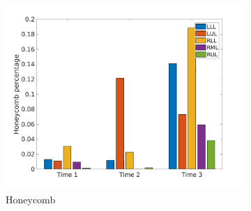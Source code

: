 \begin{figure}[H]
\begin{subfigure}{.46\linewidth}
  \includegraphics[width=\linewidth,trim={{.0\wd0} {.0\wd0} {.0\wd0} {.0\wd0}},clip]{QuantitativeAnalysis/Image/IPF15HoneycombLobarRegionDiseaseDistributionOverTime.jpg} %
  \caption{Honeycomb}
  \label{fig:IPF15LobarRegionDiseaseDistributionOverTimeMain-c} 
\end{subfigure} 
\hspace{.3in}
\begin{subfigure}{.46\linewidth}%

\end{subfigure}
\end{figure}
